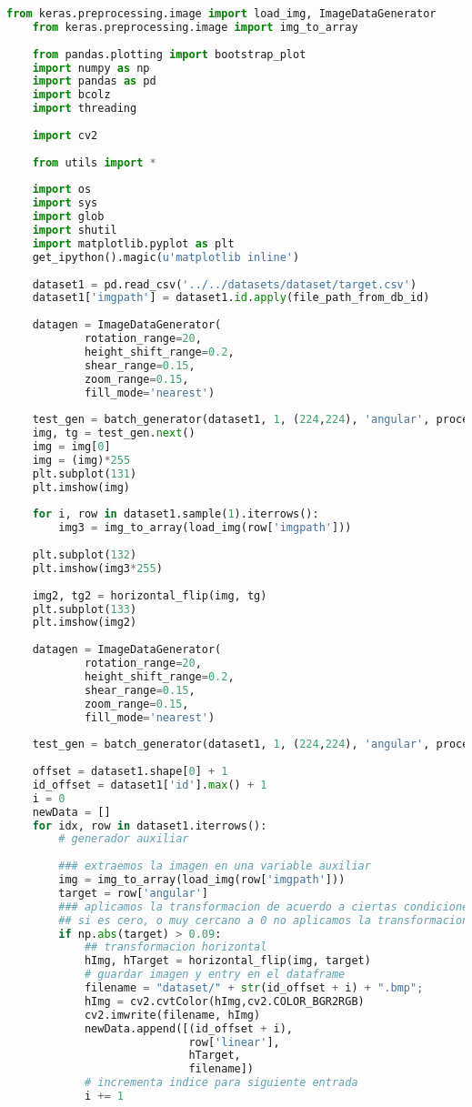 \begin{lstlisting}[title={augmentation.py},language=Python]
    from keras.preprocessing.image import load_img, ImageDataGenerator
    from keras.preprocessing.image import img_to_array
    
    from pandas.plotting import bootstrap_plot
    import numpy as np
    import pandas as pd
    import bcolz
    import threading
    
    import cv2
    
    from utils import *
    
    import os
    import sys
    import glob
    import shutil
    import matplotlib.pyplot as plt
    get_ipython().magic(u'matplotlib inline')
    
    dataset1 = pd.read_csv('../../datasets/dataset/target.csv')
    dataset1['imgpath'] = dataset1.id.apply(file_path_from_db_id)
    
    datagen = ImageDataGenerator(
            rotation_range=20,
            height_shift_range=0.2,
            shear_range=0.15,
            zoom_range=0.15,
            fill_mode='nearest')
    
    test_gen = batch_generator(dataset1, 1, (224,224), 'angular', process=False, shuffle=False)
    img, tg = test_gen.next()
    img = img[0]
    img = (img)*255
    plt.subplot(131)
    plt.imshow(img)
    
    for i, row in dataset1.sample(1).iterrows():
        img3 = img_to_array(load_img(row['imgpath']))
    
    plt.subplot(132)
    plt.imshow(img3*255)
    
    img2, tg2 = horizontal_flip(img, tg)
    plt.subplot(133)
    plt.imshow(img2)
    
    datagen = ImageDataGenerator(
            rotation_range=20,
            height_shift_range=0.2,
            shear_range=0.15,
            zoom_range=0.15,
            fill_mode='nearest')
    
    test_gen = batch_generator(dataset1, 1, (224,224), 'angular', process=False, shuffle=False)
    
    offset = dataset1.shape[0] + 1
    id_offset = dataset1['id'].max() + 1
    i = 0
    newData = []
    for idx, row in dataset1.iterrows():
        # generador auxiliar
        
        ### extraemos la imagen en una variable auxiliar
        img = img_to_array(load_img(row['imgpath']))
        target = row['angular']
        ### aplicamos la transformacion de acuerdo a ciertas condiciones
        ## si es cero, o muy cercano a 0 no aplicamos la transformacion
        if np.abs(target) > 0.09:
            ## transformacion horizontal
            hImg, hTarget = horizontal_flip(img, target) 
            # guardar imagen y entry en el dataframe
            filename = "dataset/" + str(id_offset + i) + ".bmp";
            hImg = cv2.cvtColor(hImg,cv2.COLOR_BGR2RGB)
            cv2.imwrite(filename, hImg)
            newData.append([(id_offset + i), 
                            row['linear'], 
                            hTarget,
                            filename])
            # incrementa indice para siguiente entrada
            i += 1
            

\end{lstlisting}
